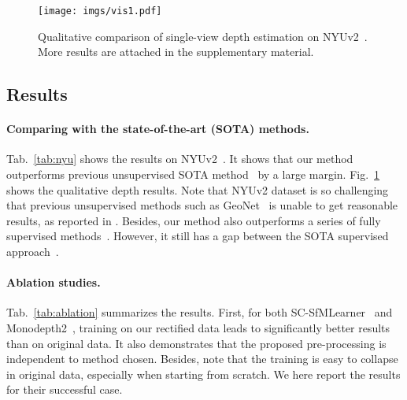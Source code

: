 \documentclass{article}
\newcommand{\figref}[1]{Fig.~\ref{#1}}
\newcommand{\tabref}[1]{Tab.~\ref{#1}}
\begin{document}
\begin{figure}[t]
\centering
\texttt{[image: imgs/vis1.pdf]}
\caption{Qualitative comparison of single-view depth estimation on NYUv2~\cite{silberman2012indoor}.
More results are attached in the supplementary material.}
\label{fig:show}
\vspace{-2mm}
\end{figure}



\subsection{Results}\label{sec:results}

\paragraph{Comparing with the state-of-the-art (SOTA) methods.}

\tabref{tab:nyu} shows the results on NYUv2~\cite{silberman2012indoor}. It shows that our method outperforms previous unsupervised SOTA method~\cite{zhao2020towards} by a large margin.
\figref{fig:show} shows the qualitative depth results.
Note that NYUv2 dataset is so challenging that previous unsupervised methods such as GeoNet~\cite{yin2018geonet} is unable to get reasonable results, as reported in \cite{Zhou_2019_ICCV}.
Besides, our method also outperforms a series of fully supervised methods~\cite{liu2016learning, saxena2006learning, karsch2014depth, liu2014discrete, ladicky2014pulling, li2015depth, roy2016monocular, wang2015towards, eigen2015predicting, chakrabarti2016depth}.
However, it still has a gap between the SOTA supervised approach~\cite{Yin2019enforcing}.


\paragraph{Ablation studies.}

\tabref{tab:ablation} summarizes the results.
First, for both SC-SfMLearner~\cite{bian2019depth} and Monodepth2~\cite{monodepth2},
training on our rectified data leads to significantly better results than on original data.
It also demonstrates that the proposed pre-processing is independent to method chosen.
Besides, note that the training is easy to collapse in original data, especially when starting from scratch.
We here report the results for their successful case.
\end{document}
